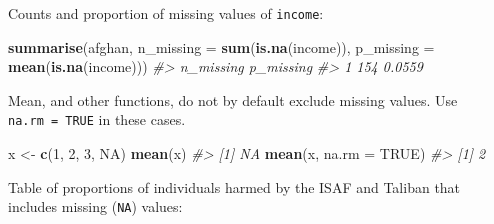 \documentclass[]{book}
\newenvironment{Shaded}{\begin{snugshade}}{\end{snugshade}}
\newcommand{\KeywordTok}[1]{\textcolor[rgb]{0.13,0.29,0.53}{\textbf{#1}}}
\newcommand{\DataTypeTok}[1]{\textcolor[rgb]{0.13,0.29,0.53}{#1}}
\newcommand{\DecValTok}[1]{\textcolor[rgb]{0.00,0.00,0.81}{#1}}
\newcommand{\StringTok}[1]{\textcolor[rgb]{0.31,0.60,0.02}{#1}}
\newcommand{\CommentTok}[1]{\textcolor[rgb]{0.56,0.35,0.01}{\textit{#1}}}
\newcommand{\OtherTok}[1]{\textcolor[rgb]{0.56,0.35,0.01}{#1}}
\newcommand{\OperatorTok}[1]{\textcolor[rgb]{0.81,0.36,0.00}{\textbf{#1}}}
\newcommand{\NormalTok}[1]{#1}
\theoremstyle{definition}
\theoremstyle{definition}
\theoremstyle{definition}
\theoremstyle{remark}
\begin{document}
Counts and proportion of missing values of \texttt{income}:

\begin{Shaded}
\begin{Highlighting}[]
\KeywordTok{summarise}\NormalTok{(afghan,}
          \DataTypeTok{n_missing =} \KeywordTok{sum}\NormalTok{(}\KeywordTok{is.na}\NormalTok{(income)),}
          \DataTypeTok{p_missing =} \KeywordTok{mean}\NormalTok{(}\KeywordTok{is.na}\NormalTok{(income)))}
\CommentTok{#>   n_missing p_missing}
\CommentTok{#> 1       154    0.0559}
\end{Highlighting}
\end{Shaded}

Mean, and other functions, do not by default exclude missing values. Use
\texttt{na.rm\ =\ TRUE} in these cases.

\begin{Shaded}
\begin{Highlighting}[]
\NormalTok{x <-}\StringTok{ }\KeywordTok{c}\NormalTok{(}\DecValTok{1}\NormalTok{, }\DecValTok{2}\NormalTok{, }\DecValTok{3}\NormalTok{, }\OtherTok{NA}\NormalTok{)}
\KeywordTok{mean}\NormalTok{(x)}
\CommentTok{#> [1] NA}
\KeywordTok{mean}\NormalTok{(x, }\DataTypeTok{na.rm =} \OtherTok{TRUE}\NormalTok{)}
\CommentTok{#> [1] 2}
\end{Highlighting}
\end{Shaded}

Table of proportions of individuals harmed by the ISAF and Taliban that
includes missing (\texttt{NA}) values:

\begin{Shaded}
\end{Shaded}
\end{document}
